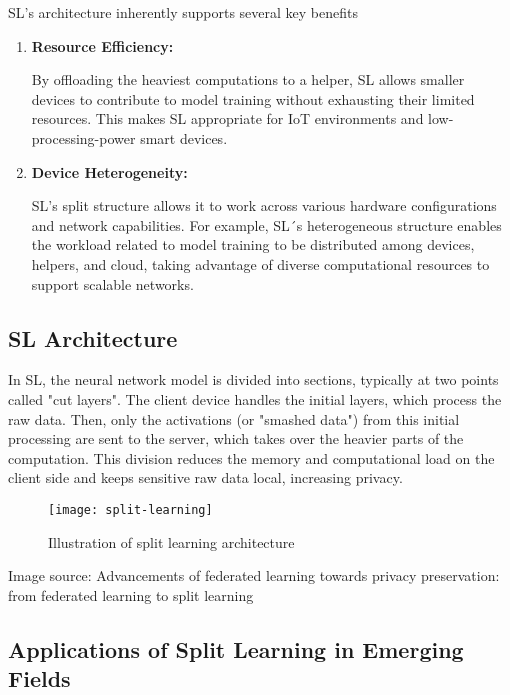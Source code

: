 SL’s architecture inherently supports several key benefits

\begin{enumerate}
	\item \textbf{Resource Efficiency:} 
	
	By offloading the heaviest computations to a helper, \gls{SL} allows smaller devices to contribute to model training without exhausting their limited resources. This makes SL appropriate for IoT environments and low-processing-power smart devices.
	
	\item \textbf{Device Heterogeneity:} 
	
	SL’s split structure allows it to work across various hardware configurations and network capabilities. For example, SL´s heterogeneous structure enables the workload related to model training to be distributed among devices, helpers, and cloud, taking advantage of diverse computational resources to support scalable networks.
\end{enumerate}

\subsection{SL Architecture}
\label{sec:sl_architecture}

In \gls{SL}, the neural network model is divided into sections, typically at two points called "cut layers". The client device handles the initial layers, which process the raw data. Then, only the activations (or "smashed data") from this initial processing are sent to the server, which takes over the heavier parts of the computation. This division reduces the memory and computational load on the client side and keeps sensitive raw data local, increasing privacy.


\begin{figure}[H]
  \centering
  \texttt{[image: split-learning]}
  \caption{Illustration of split learning architecture}
  \label{fig:split_learning_architecture}
\end{figure}


Image source: Advancements of federated learning towards privacy preservation: from federated learning to split learning

\subsection{Applications of Split Learning in Emerging Fields}
\label{sec:application_of_sl_in_emerging_fields}



